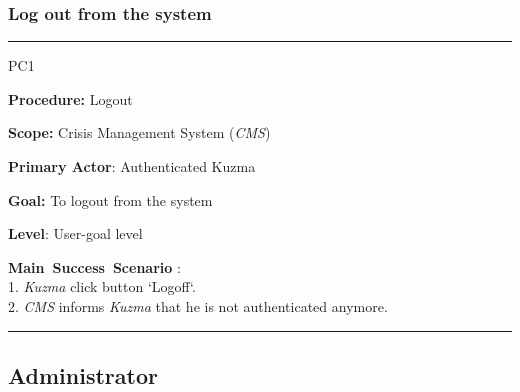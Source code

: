 \subsubsection{Log out from the system}
\vspace{0.5cm}
\hrule
\begin{lyxlist}{PC1}
\small{
\item [\textbf{Procedure:}] Logout
\item [\textbf{Scope:}] Crisis Management System (\emph{CMS})
\item [\textbf{Primary Actor}:] Authenticated Kuzma
\item [\textbf{Goal:}] To logout from the system
\item [\textbf{Level}:] User-goal level
\item [\textbf{Main~Success~Scenario}]:\\
1. \emph{Kuzma} click button `Logoff`.\\
2. \emph{CMS} informs \emph{Kuzma} that he is not authenticated anymore.\\
}
\end{lyxlist}
\hrule
\vspace{0.5cm}



\subsection{Administrator}


